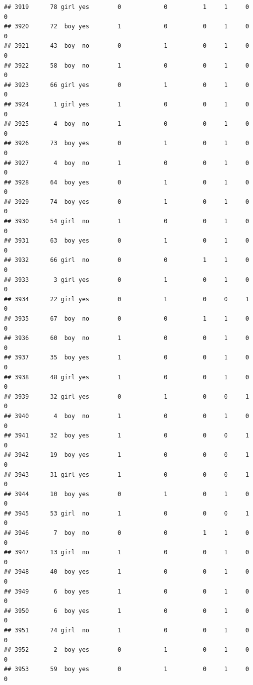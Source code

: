 \documentclass[man]{apa6}
\begin{document}
\begin{verbatim}
## 3919      78 girl yes        0            0          1     1     0     0
## 3920      72  boy yes        1            0          0     1     0     0
## 3921      43  boy  no        0            1          0     1     0     0
## 3922      58  boy  no        1            0          0     1     0     0
## 3923      66 girl yes        0            1          0     1     0     0
## 3924       1 girl yes        1            0          0     1     0     0
## 3925       4  boy  no        1            0          0     1     0     0
## 3926      73  boy yes        0            1          0     1     0     0
## 3927       4  boy  no        1            0          0     1     0     0
## 3928      64  boy yes        0            1          0     1     0     0
## 3929      74  boy yes        0            1          0     1     0     0
## 3930      54 girl  no        1            0          0     1     0     0
## 3931      63  boy yes        0            1          0     1     0     0
## 3932      66 girl  no        0            0          1     1     0     0
## 3933       3 girl yes        0            1          0     1     0     0
## 3934      22 girl yes        0            1          0     0     1     0
## 3935      67  boy  no        0            0          1     1     0     0
## 3936      60  boy  no        1            0          0     1     0     0
## 3937      35  boy yes        1            0          0     1     0     0
## 3938      48 girl yes        1            0          0     1     0     0
## 3939      32 girl yes        0            1          0     0     1     0
## 3940       4  boy  no        1            0          0     1     0     0
## 3941      32  boy yes        1            0          0     0     1     0
## 3942      19  boy yes        1            0          0     0     1     0
## 3943      31 girl yes        1            0          0     0     1     0
## 3944      10  boy yes        0            1          0     1     0     0
## 3945      53 girl  no        1            0          0     0     1     0
## 3946       7  boy  no        0            0          1     1     0     0
## 3947      13 girl  no        1            0          0     1     0     0
## 3948      40  boy yes        1            0          0     1     0     0
## 3949       6  boy yes        1            0          0     1     0     0
## 3950       6  boy yes        1            0          0     1     0     0
## 3951      74 girl  no        1            0          0     1     0     0
## 3952       2  boy yes        0            1          0     1     0     0
## 3953      59  boy yes        0            1          0     1     0     0

\end{verbatim}
\end{document}
